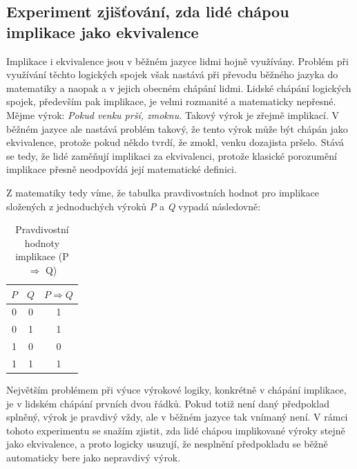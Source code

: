 \subsection{Experiment zjiš\v tování, zda lidé chápou implikace jako ekvivalence}
Implikace i ekvivalence jsou v běžném jazyce lidmi hojně využívány. Problém při využívání těchto logických spojek však nastává při převodu běžného jazyka do matematiky a naopak a v jejich obecném chápání lidmi. Lidské chápání logických spojek, především pak implikace, je velmi rozmanité a matematicky nepřesné. Mějme výrok: \textit{\clqq Pokud venku prší, zmoknu.\crqq } Takový výrok je zřejmě implikací. V běžném jazyce ale nastává problém takový, že tento výrok m\r uže být chápán jako ekvivalence, protože pokud někdo tvrdí, že zmokl, venku dozajista pršelo. Stává se tedy, že lidé zamě\v nují implikaci za ekvivalenci, protože klasické porozumění implikace přesně neodpovídá její matematické definici.


Z matematiky tedy víme, že tabulka pravdivostních hodnot pro implikace složených z jednoduchých výrok\r u \textit{P} a \textit{Q} vypadá následovně:
\begin{table}[H]
    \centering
    \begin{tabular}{|c|c|c|}
        \hline
        \(P\) & \(Q\) & \(P \Rightarrow Q\) \\ 
        \hline
        0 & 0 & 1 \\ 
        \hline
        0 & 1 & 1 \\ 
        \hline
        1 & 0 & 0 \\ 
        \hline
        1 & 1 & 1 \\ 
        \hline
    \end{tabular}
    \caption{Pravdivostní hodnoty implikace (P $\Rightarrow$ Q)}
\end{table}

Největším problémem při výuce výrokové logiky, konkrétně v chápání implikace, je v lidském chápání prvních dvou řádk\r u. Pokud totiž není daný předpoklad splněný, výrok je pravdivý vždy, ale v běžném jazyce tak vnímaný není. V rámci tohoto experimentu se snažím zjistit, zda lidé chápou implikované výroky stejně jako ekvivalence, a proto logicky usuzují, že nesplnění předpokladu se běžně automaticky bere jako nepravdivý výrok.

